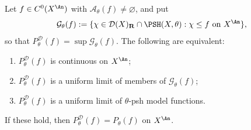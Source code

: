 \begin{corollary}
\label{cor:ch23-continuity-criterion}
Let $f\in C^0(X^{\An})$ with $\mathcal A_\theta(f)\ne\varnothing$, and
put
\begin{equation}\label{eq:ch23-model-competitor-family}
 \mathcal G_\theta(f):=\{\chi\in\mathcal D(X)_{\mathbf R}\cap\PSH(X,\theta):
   \chi\leq f\text{ on }X^{\An}\},
\end{equation}
so that $P^{\mathcal D}_\theta(f)=\sup\mathcal G_\theta(f)$.  The
following are equivalent:
\begin{enumerate}
\item $P^{\mathcal D}_\theta(f)$ is continuous on $X^{\An}$;
\item $P^{\mathcal D}_\theta(f)$ is a uniform limit of members of
$\mathcal G_\theta(f)$;
\item $P^{\mathcal D}_\theta(f)$ is a uniform limit of $\theta$-psh
model functions.
\end{enumerate}
If these hold, then $P^{\mathcal D}_\theta(f)=P_\theta(f)$ on $X^{\An}$.
\end{corollary}


